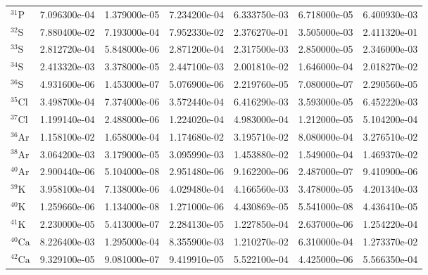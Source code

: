 \begin{tabular}{lrrrrrr}
$^{31}\mathrm{P}$   &       7.096300e-04 &      1.379000e-05 &      7.234200e-04 &       6.333750e-03 &      6.718000e-05 &      6.400930e-03 \\
$^{32}\mathrm{S}$   &       7.880400e-02 &      7.193000e-04 &      7.952330e-02 &       2.376270e-01 &      3.505000e-03 &      2.411320e-01 \\
$^{33}\mathrm{S}$   &       2.812720e-04 &      5.848000e-06 &      2.871200e-04 &       2.317500e-03 &      2.850000e-05 &      2.346000e-03 \\
$^{34}\mathrm{S}$   &       2.413320e-03 &      3.378000e-05 &      2.447100e-03 &       2.001810e-02 &      1.646000e-04 &      2.018270e-02 \\
$^{36}\mathrm{S}$   &       4.931600e-06 &      1.453000e-07 &      5.076900e-06 &       2.219760e-05 &      7.080000e-07 &      2.290560e-05 \\
$^{35}\mathrm{Cl}$  &       3.498700e-04 &      7.374000e-06 &      3.572440e-04 &       6.416290e-03 &      3.593000e-05 &      6.452220e-03 \\
$^{37}\mathrm{Cl}$  &       1.199140e-04 &      2.488000e-06 &      1.224020e-04 &       4.983000e-04 &      1.212000e-05 &      5.104200e-04 \\
$^{36}\mathrm{Ar}$  &       1.158100e-02 &      1.658000e-04 &      1.174680e-02 &       3.195710e-02 &      8.080000e-04 &      3.276510e-02 \\
$^{38}\mathrm{Ar}$  &       3.064200e-03 &      3.179000e-05 &      3.095990e-03 &       1.453880e-02 &      1.549000e-04 &      1.469370e-02 \\
$^{40}\mathrm{Ar}$  &       2.900440e-06 &      5.104000e-08 &      2.951480e-06 &       9.162200e-06 &      2.487000e-07 &      9.410900e-06 \\
$^{39}\mathrm{K}$   &       3.958100e-04 &      7.138000e-06 &      4.029480e-04 &       4.166560e-03 &      3.478000e-05 &      4.201340e-03 \\
$^{40}\mathrm{K}$   &       1.259660e-06 &      1.134000e-08 &      1.271000e-06 &       4.430869e-05 &      5.541000e-08 &      4.436410e-05 \\
$^{41}\mathrm{K}$   &       2.230000e-05 &      5.413000e-07 &      2.284130e-05 &       1.227850e-04 &      2.637000e-06 &      1.254220e-04 \\
$^{40}\mathrm{Ca}$  &       8.226400e-03 &      1.295000e-04 &      8.355900e-03 &       1.210270e-02 &      6.310000e-04 &      1.273370e-02 \\
$^{42}\mathrm{Ca}$  &       9.329100e-05 &      9.081000e-07 &      9.419910e-05 &       5.522100e-04 &      4.425000e-06 &      5.566350e-04 \\

\end{tabular}
